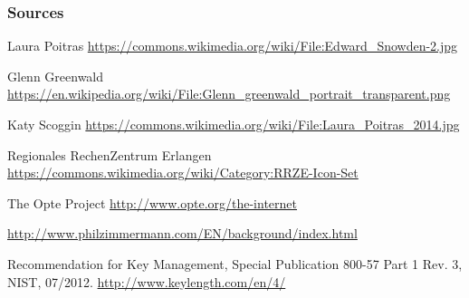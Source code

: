 \documentclass{beamer}
\begin{document}


  
\begin{frame}
\frametitle{Sources}

\begin{thebibliography}{1}
\scriptsize

	 Laura Poitras \url{https://commons.wikimedia.org/wiki/File:Edward_Snowden-2.jpg} 
	
	 Glenn Greenwald  \url{https://en.wikipedia.org/wiki/File:Glenn_greenwald_portrait_transparent.png}
	
	 Katy Scoggin \url{https://commons.wikimedia.org/wiki/File:Laura_Poitras_2014.jpg}
	
	 Regionales RechenZentrum Erlangen  \url{https://commons.wikimedia.org/wiki/Category:RRZE-Icon-Set}
	
	  The Opte Project \url{http://www.opte.org/the-internet}
	
	 \url{http://www.philzimmermann.com/EN/background/index.html}
	
	 Recommendation for Key Management, Special Publication 800-57 Part 1 Rev. 3, NIST, 07/2012. \url{http://www.keylength.com/en/4/}

\end{thebibliography}
\end{frame}
\end{document}
